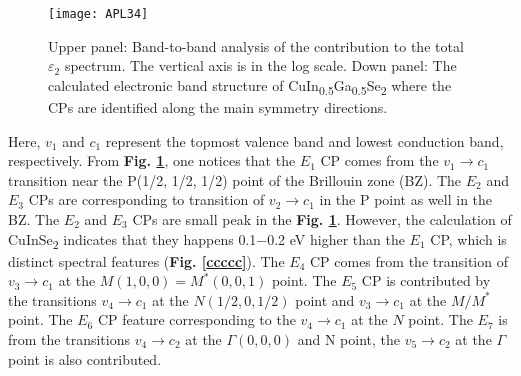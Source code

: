 \documentclass[a4paper, 12pt, titlepage,oneside,drop]{kthesis}
\begin{document}
 \begin{figure}[H]
    \begin{center}
            \texttt{[image: APL34]}
     \end{center}
    \caption{Upper panel: Band-to-band analysis of the contribution to the total $\varepsilon_2$ spectrum. The vertical axis is in the log scale. 
              Down panel: The calculated electronic band structure of CuIn\textsubscript{0.5}Ga\textsubscript{0.5}Se\textsubscript{2} where the CPs are identified along the main symmetry directions.}
   \label{df2}
\end{figure}

Here, $v_1$ and $c_1$ represent the topmost valence band and lowest conduction band, respectively. From \textbf{Fig. \ref{df2}}, one notices that the $E_1$ CP comes from 
the $v_1 \longrightarrow c_1$ transition near the P(1/2, 1/2, 1/2) point of the Brillouin zone (BZ). The $E_2$ and $E_3$ CPs are corresponding to transition of $v_2 \longrightarrow c_1$ in the P point
as well in the BZ. The $E_2$ and $E_3$ CPs are small peak in the \textbf{Fig. \ref{df2}}. However, the calculation of CuInSe\textsubscript{2} indicates that they happens 0.1$-$0.2 eV higher than 
the $E_1$ CP, which is distinct spectral features (\textbf{Fig. \ref{ccccc}}). The $E_4$ CP comes from the transition of $v_3 \longrightarrow c_1$ at the $M (1,0,0) = M^*(0,0,1)$ point.
The $E_5$ CP is contributed by the transitions $v_4 \longrightarrow c_1$ at the $N (1/2,0,1/2)$ point and $v_3 \longrightarrow c_1$ at the $M/M^*$ point. The $E_6$ CP feature
corresponding to the  $v_4 \longrightarrow c_1$ at the $N$ point. The $E_7$ is from the transitions $v_4 \longrightarrow c_2$ at the $\Gamma (0,0,0)$ and N point, the 
  $v_5 \longrightarrow c_2$ at the $\Gamma$ point is also contributed.
\end{document}
